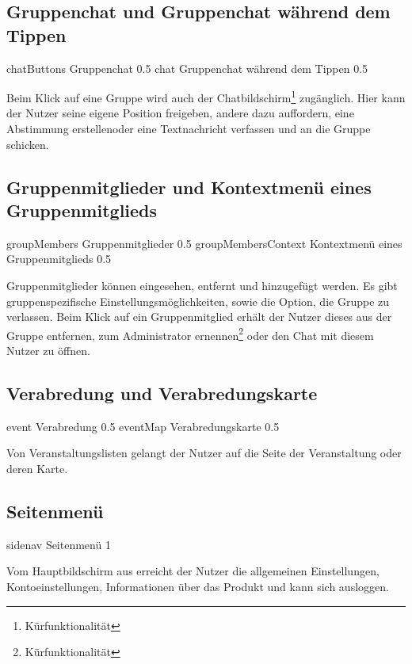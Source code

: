 \documentclass[parskip=full,11pt]{scrartcl}
\begin{document}
\pagebreak
\subsection{Gruppenchat und Gruppenchat während dem Tippen}
{chatButtons}
{Gruppenchat}
{0.5}
{chat}
{Gruppenchat während dem Tippen}
{0.5}

Beim Klick auf eine Gruppe wird auch der
Chatbildschirm\footnote[1]{Kürfunktionalität} zugänglich.
Hier kann der Nutzer seine eigene Position freigeben, andere dazu auffordern,
eine Abstimmung erstellen\footnotemark[1] oder eine Textnachricht verfassen
und an die Gruppe schicken\footnotemark[1].

\pagebreak
\subsection{Gruppenmitglieder und Kontextmenü eines Gruppenmitglieds}
{groupMembers}
{Gruppenmitglieder}
{0.5}
{groupMembersContext}
{Kontextmenü eines Gruppenmitglieds}
{0.5}

Gruppenmitglieder können eingesehen, entfernt und hinzugefügt werden.
Es gibt gruppenspezifische Einstellungsmöglichkeiten, sowie die Option,
die Gruppe zu verlassen.
Beim Klick auf ein Gruppenmitglied erhält der Nutzer dieses aus der
Gruppe entfernen, zum Administrator ernennen\footnote[1]{Kürfunktionalität}
oder den Chat mit diesem Nutzer zu öffnen\footnotemark[1].

\pagebreak
\subsection{Verabredung  und Verabredungskarte}
{event}
{Verabredung}
{0.5}
{eventMap}
{Verabredungskarte}
{0.5}

Von Veranstaltungslisten gelangt der Nutzer auf die Seite der Veranstaltung oder deren Karte.

\pagebreak
\subsection{Seitenmenü}
{sidenav}
{Seitenmenü}
{1}

Vom Hauptbildschirm aus erreicht der Nutzer die allgemeinen Einstellungen, Kontoeinstellungen, Informationen über das Produkt und kann sich ausloggen.
\end{document}
